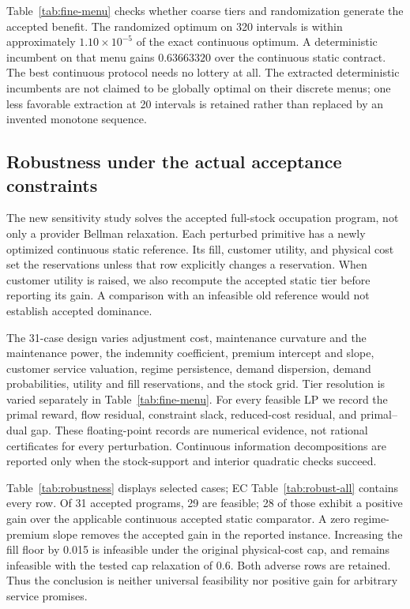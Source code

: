 Table~\ref{tab:fine-menu} checks whether coarse tiers and randomization generate the accepted benefit. The randomized optimum on 320 intervals is within approximately $1.10\times10^{-5}$ of the exact continuous optimum. A deterministic incumbent on that menu gains $0.63663320$ over the continuous static contract. The best continuous protocol needs no lottery at all. The extracted deterministic incumbents are not claimed to be globally optimal on their discrete menus; one less favorable extraction at 20 intervals is retained rather than replaced by an invented monotone sequence.


\subsection{Robustness under the actual acceptance constraints}
The new sensitivity study solves the accepted full-stock occupation program, not only a provider Bellman relaxation. Each perturbed primitive has a newly optimized continuous static reference. Its fill, customer utility, and physical cost set the reservations unless that row explicitly changes a reservation. When customer utility is raised, we also recompute the accepted static tier before reporting its gain. A comparison with an infeasible old reference would not establish accepted dominance.

The 31-case design varies adjustment cost, maintenance curvature and the maintenance power, the indemnity coefficient, premium intercept and slope, customer service valuation, regime persistence, demand dispersion, demand probabilities, utility and fill reservations, and the stock grid. Tier resolution is varied separately in Table~\ref{tab:fine-menu}. For every feasible LP we record the primal reward, flow residual, constraint slack, reduced-cost residual, and primal--dual gap. These floating-point records are numerical evidence, not rational certificates for every perturbation. Continuous information decompositions are reported only when the stock-support and interior quadratic checks succeed.

Table~\ref{tab:robustness} displays selected cases; EC Table~\ref{tab:robust-all} contains every row. Of 31 accepted programs, 29 are feasible; 28 of those exhibit a positive gain over the applicable continuous accepted static comparator. A zero regime-premium slope removes the accepted gain in the reported instance. Increasing the fill floor by 0.015 is infeasible under the original physical-cost cap, and remains infeasible with the tested cap relaxation of 0.6. Both adverse rows are retained. Thus the conclusion is neither universal feasibility nor positive gain for arbitrary service promises.


